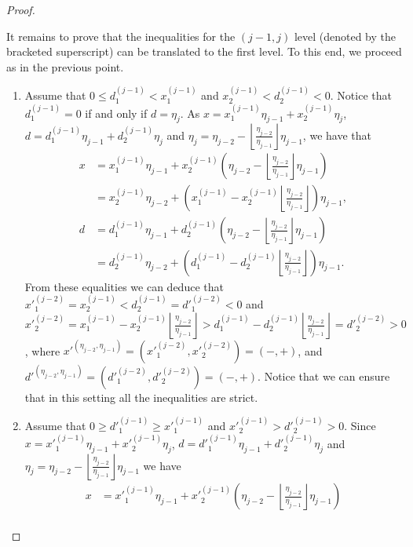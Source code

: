 \documentclass[11pt]{amsart}
\theoremstyle{remark}
\newcommand{\peb}[1]{\left\lfloor {#1}\right\rfloor}
\begin{document}
\begin{proof}
\begin{enumerate}[(1)]
       	It remains to prove that the inequalities for the $(j-1,j)$ level (denoted by the bracketed superscript) can be translated to the first level. To this end, we proceed as in the previous point.
       	  \begin{enumerate}
       	  	\item Assume that $0\le d^{(j-1)}_1<x^{(j-1)}_1$ and $x^{(j-1)}_2<d^{(j-1)}_2<0$. Notice that  $d^{(j-1)}_1=0$ if and only if $d=\eta_{j}$. As $x=x^{(j-1)}_1\eta_{j-1}+x^{(j-1)}_2\eta_j$, $d=d^{(j-1)}_1\eta_{j-1}+d^{(j-1)}_2\eta_j$ and $\eta_j=\eta_{j-2}-\peb {\frac{\eta_{j-2}}{\eta_{j-1}}}\eta_{j-1}$, we have that 
       	      \[
       	       	\begin{aligned}
       	       	x & =  x^{(j-1)}_1\eta_{j-1}+x^{(j-1)}_2\left(\eta_{j-2}-\peb{\tfrac{\eta_{j-2}}{\eta_{j-1}}} \eta_{j-1}\right ) \\
       	       	 & =  x^{(j-1)}_2\eta_{j-2}+\left(x^{(j-1)}_1-x^{(j-1)}_2\peb{\tfrac{\eta_{j-2}}{\eta_{j-1}}}\right )\eta_{j-1}, \\
       	       	d & =   d^{(j-1)}_1\eta_{j-1}+d^{(j-1)}_2\left(\eta_{j-2}-\peb{\tfrac{\eta_{j-2}}{\eta_{j-1}}}\eta_{j-1}\right ) \\
       	       	& =  d^{(j-1)}_2\eta_{j-2}+\left(d^{(j-1)}_1-d^{(j-1)}_2\peb{\tfrac{\eta_{j-2}}{\eta_{j-1}}}\right )\eta_{j-1}. 
       	       	\end{aligned}
       	      \]
       	      From these equalities we can deduce that $x'^{(j-2)}_1=x^{(j-1)}_2<d^{(j-1)}_2=d'^{(j-2)}_1<0$ and  $x'^{(j-2)}_2= x^{(j-1)}_1-x^{(j-1)}_2\peb{\tfrac{\eta_{j-2}}{\eta_{j-1}}}> d^{(j-1)}_1-d^{(j-1)}_2\peb{\tfrac{\eta_{j-2}}{\eta_{j-1}}}= d'^{(j-2)}_2>0$, where $x'^{(\eta_{j-2},\eta_{j-1})}=(x'^{(j-2)}_1,x'^{(j-2)}_2)=(-,+)$, and $d'^{(\eta_{j-2},\eta_{j-1})}=(d'^{(j-2)}_1,d'^{(j-2)}_2)=(-,+)$. Notice that we can ensure that in this setting all the inequalities are strict.
        	     \item Assume that  $0\ge d'^{(j-1)}_1\ge x'^{(j-1)}_1$ and $x'^{(j-1)}_2>d'^{(j-1)}_2>0$. Since $x=x'^{(j-1)}_1\eta_{j-1}+x'^{(j-1)}_2\eta_j$, $d=d'^{(j-1)}_1\eta_{j-1}+d'^{(j-1)}_2\eta_j$ and $\eta_j=\eta_{j-2}-\peb{\frac{\eta_{j-2}}{\eta_{j-1}}}\eta_{j-1}$ we have 
       	     \[
       	     \begin{aligned}
       	     x & =  x'^{(j-1)}_1\eta_{j-1}+x'^{(j-1)}_2\left(\eta_{j-2}-\peb{\tfrac{\eta_{j-2}}{\eta_{j-1}}}\eta_{j-1}\right ) \\

\end{aligned}\]
\end{enumerate}
\end{enumerate}
\end{proof}
\end{document}
